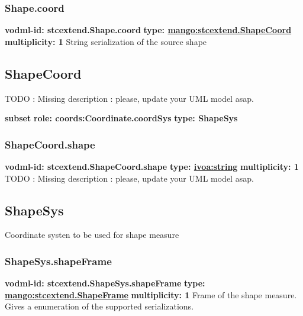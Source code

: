     \subsubsection{Shape.coord}
      \textbf{vodml-id: stcextend.Shape.coord} \newline
      \textbf{type: \hyperref[sect:stcextend.ShapeCoord]{mango:stcextend.ShapeCoord}} \newline
      \textbf{multiplicity: 1} \newline 
      String serialization of the source shape

  \subsection{ShapeCoord}
  \label{sect:stcextend.ShapeCoord}
    TODO : Missing description : please, update your UML model asap.

    \noindent \textbf{subset} \newline
    \indent   \textbf{role: coords:Coordinate.coordSys} \newline
    \indent   \textbf{type: ShapeSys} \newline


    \subsubsection{ShapeCoord.shape}
      \textbf{vodml-id: stcextend.ShapeCoord.shape} \newline
      \textbf{type: \hyperref[sect:ivoa]{ivoa:string}} \newline
      \textbf{multiplicity: 1} \newline 
      TODO : Missing description : please, update your UML model asap.

  \subsection{ShapeSys}
  \label{sect:stcextend.ShapeSys}
    Coordinate systen to be used for shape measure

    \subsubsection{ShapeSys.shapeFrame}
      \textbf{vodml-id: stcextend.ShapeSys.shapeFrame} \newline
      \textbf{type: \hyperref[sect:stcextend.ShapeFrame]{mango:stcextend.ShapeFrame}} \newline
      \textbf{multiplicity: 1} \newline 
      Frame of the shape measure. Gives a enumeration of the supported serializations.

